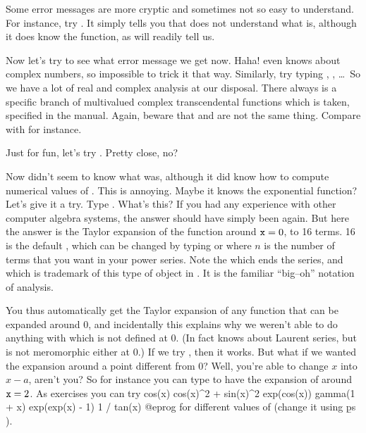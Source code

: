 Some error messages are more cryptic and sometimes not so easy to understand.
For instance, try . It simply tells you that  does not
understand what  is, although it does know the 
function, as  will readily tell us.

Now let's try  to see what error message we get now. Haha!
 even knows about complex numbers, so impossible to trick it that
way. Similarly, try typing , , \dots\ So we have a lot of real and complex analysis at our disposal.
There always is a specific branch of multivalued complex transcendental
functions which is taken, specified in the manual. Again, beware that
 and  are not the same thing. Compare  with
 for instance.

Just for fun, let's try . Pretty close, no?

\medskip
Now  didn't seem to know what  was, although it did know
how to compute numerical values of . This is annoying. Maybe it
knows the exponential function? Let's give it a try. Type .
What's this? If you had any experience with other computer algebra systems,
the answer should have simply been  again. But here the answer is
the Taylor expansion of the function around ${\tt x}=0$, to 16 terms. 16 is
the default , which can be changed by typing  or  where $n$ is the number of terms
that you want in your power series. Note the  which ends the
series, and which is trademark of this type of object in . It is the
familiar ``big--oh'' notation of analysis.

You thus automatically get the Taylor expansion of any function that can be
expanded around $0$, and incidentally this explains why we weren't able to do
anything with  which is not defined at $0$. (In fact 
knows about Laurent series, but  is not meromorphic either at
$0$.) If we try , then it works. But what if we wanted the
expansion around a point different from 0? Well, you're able to change $x$
into $x-a$, aren't you? So for instance you can type  to have
the expansion of  around ${\tt x}=2$. As exercises you can try
\bprog
  cos(x)
  cos(x)^2 + sin(x)^2
  exp(cos(x))
  gamma(1 + x)
  exp(exp(x) - 1)
  1 / tan(x)
@eprog\noindent
for different values of  (change it using \b{ps}
).

